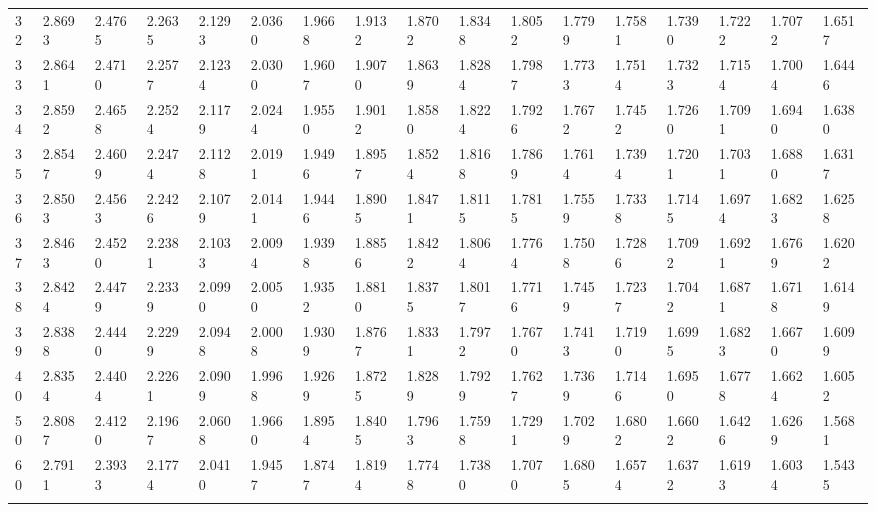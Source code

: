 {\begin{tabular}{|m{8pt}|m{18pt}*{15}{m{18pt}}}
 32 & 2.8693 & 2.4765 & 2.2635 & 2.1293 & 2.0360 & 1.9668 & 1.9132 & 1.8702 & 1.8348 & 1.8052 & 1.7799 & 1.7581 & 1.7390 & 1.7222 & 1.7072 & 1.6517 \\[2pt] \arrayrulecolor{light-gray}\hline\arrayrulecolor{black}  
 33 & 2.8641 & 2.4710 & 2.2577 & 2.1234 & 2.0300 & 1.9607 & 1.9070 & 1.8639 & 1.8284 & 1.7987 & 1.7733 & 1.7514 & 1.7323 & 1.7154 & 1.7004 & 1.6446 \\[2pt] \arrayrulecolor{light-gray}\hline\arrayrulecolor{black}  
 34 & 2.8592 & 2.4658 & 2.2524 & 2.1179 & 2.0244 & 1.9550 & 1.9012 & 1.8580 & 1.8224 & 1.7926 & 1.7672 & 1.7452 & 1.7260 & 1.7091 & 1.6940 & 1.6380 \\[2pt] \arrayrulecolor{light-gray}\hline\arrayrulecolor{black}  
 35 & 2.8547 & 2.4609 & 2.2474 & 2.1128 & 2.0191 & 1.9496 & 1.8957 & 1.8524 & 1.8168 & 1.7869 & 1.7614 & 1.7394 & 1.7201 & 1.7031 & 1.6880 & 1.6317 \\[2pt] \arrayrulecolor{light-gray}\hline\arrayrulecolor{black}  
 36 & 2.8503 & 2.4563 & 2.2426 & 2.1079 & 2.0141 & 1.9446 & 1.8905 & 1.8471 & 1.8115 & 1.7815 & 1.7559 & 1.7338 & 1.7145 & 1.6974 & 1.6823 & 1.6258 \\[2pt] \arrayrulecolor{light-gray}\hline\arrayrulecolor{black}  
 37 & 2.8463 & 2.4520 & 2.2381 & 2.1033 & 2.0094 & 1.9398 & 1.8856 & 1.8422 & 1.8064 & 1.7764 & 1.7508 & 1.7286 & 1.7092 & 1.6921 & 1.6769 & 1.6202 \\[2pt] \arrayrulecolor{light-gray}\hline\arrayrulecolor{black}  
 38 & 2.8424 & 2.4479 & 2.2339 & 2.0990 & 2.0050 & 1.9352 & 1.8810 & 1.8375 & 1.8017 & 1.7716 & 1.7459 & 1.7237 & 1.7042 & 1.6871 & 1.6718 & 1.6149 \\[2pt] \arrayrulecolor{light-gray}\hline\arrayrulecolor{black}  
 39 & 2.8388 & 2.4440 & 2.2299 & 2.0948 & 2.0008 & 1.9309 & 1.8767 & 1.8331 & 1.7972 & 1.7670 & 1.7413 & 1.7190 & 1.6995 & 1.6823 & 1.6670 & 1.6099 \\[2pt] \arrayrulecolor{light-gray}\hline\arrayrulecolor{black}  
 40 & 2.8354 & 2.4404 & 2.2261 & 2.0909 & 1.9968 & 1.9269 & 1.8725 & 1.8289 & 1.7929 & 1.7627 & 1.7369 & 1.7146 & 1.6950 & 1.6778 & 1.6624 & 1.6052 \\[2pt] \arrayrulecolor{light-gray}\hline\arrayrulecolor{black}  
 50 & 2.8087 & 2.4120 & 2.1967 & 2.0608 & 1.9660 & 1.8954 & 1.8405 & 1.7963 & 1.7598 & 1.7291 & 1.7029 & 1.6802 & 1.6602 & 1.6426 & 1.6269 & 1.5681 \\[2pt] \arrayrulecolor{light-gray}\hline\arrayrulecolor{black}  
 60 & 2.7911 & 2.3933 & 2.1774 & 2.0410 & 1.9457 & 1.8747 & 1.8194 & 1.7748 & 1.7380 & 1.7070 & 1.6805 & 1.6574 & 1.6372 & 1.6193 & 1.6034 & 1.5435 \\[2pt] \arrayrulecolor{light-gray}\hline\arrayrulecolor{black}  

\end{tabular}}
